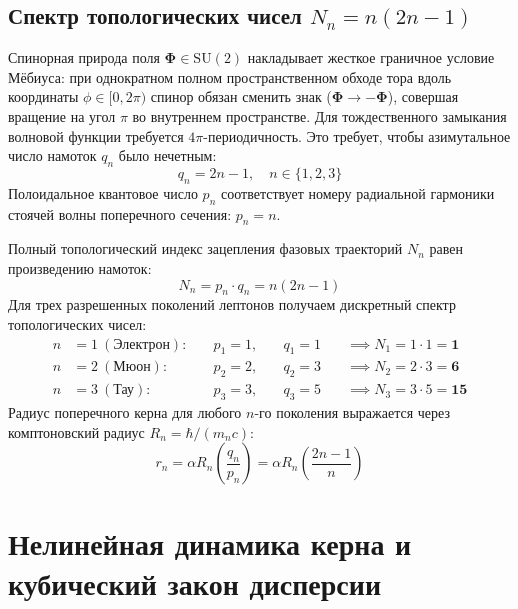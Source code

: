 \documentclass[12pt,a4paper]{article}
\begin{document}
	\subsection{Спектр топологических чисел $N_n = n(2n-1)$}
	Спинорная природа поля $\boldsymbol{\Phi} \in \mathrm{SU}(2)$ накладывает жесткое граничное условие Мёбиуса: при однократном полном пространственном обходе тора вдоль координаты $\phi \in [0, 2\pi)$ спинор обязан сменить знак ($\boldsymbol{\Phi} \to -\boldsymbol{\Phi}$), совершая вращение на угол $\pi$ во внутреннем пространстве. Для тождественного замыкания волновой функции требуется $4\pi$-периодичность. Это требует, чтобы азимутальное число намоток $q_n$ было нечетным:
	\begin{equation}
		q_n = 2n - 1, \quad n \in \{1, 2, 3\}
	\end{equation}
	Полоидальное квантовое число $p_n$ соответствует номеру радиальной гармоники стоячей волны поперечного сечения: $p_n = n$.
	
	Полный топологический индекс зацепления фазовых траекторий $N_n$ равен произведению намоток:
	\begin{equation}
		N_n = p_n \cdot q_n = n(2n - 1)
	\end{equation}
	Для трех разрешенных поколений лептонов получаем дискретный спектр топологических чисел:
	\begin{align}
		n &= 1 \ (\text{Электрон}): \quad &p_1 = 1, \quad &q_1 = 1 \quad &\implies N_1 = 1 \cdot 1 = \mathbf{1} \\
		n &= 2 \ (\text{Мюон}):     \quad &p_2 = 2, \quad &q_2 = 3 \quad &\implies N_2 = 2 \cdot 3 = \mathbf{6} \\
		n &= 3 \ (\text{Тау}):      \quad &p_3 = 3, \quad &q_3 = 5 \quad &\implies N_3 = 3 \cdot 5 = \mathbf{15}
	\end{align}
	Радиус поперечного керна для любого $n$-го поколения выражается через комптоновский радиус $R_n = \hbar / (m_n c)$:
	\begin{equation}
		r_n = \alpha R_n \left( \frac{q_n}{p_n} \right) = \alpha R_n \left( \frac{2n-1}{n} \right)
	\end{equation}
	
	\section{Нелинейная динамика керна и кубический закон дисперсии}
	
\end{document}
